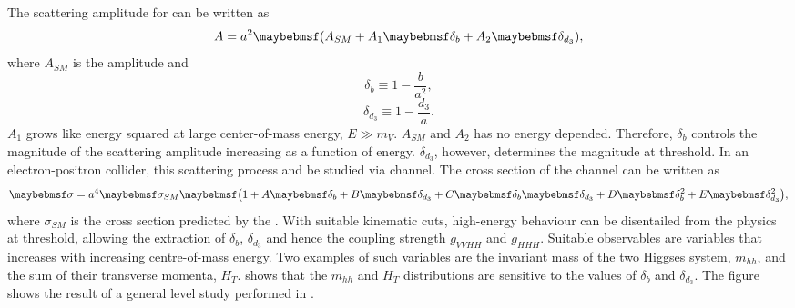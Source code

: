 The scattering amplitude for  can be written as
\begin{equation}
A = a^2\parenths{A_{SM} + A_1\delta_b + A_2\delta_{d_3}},
\end{equation}
where $A_{SM}$ is the \SM amplitude and
\begin{equation}
\delta_b \equiv 1 - \frac{b}{a^2},
\end{equation}
\begin{equation}
\delta_{d_3} \equiv 1 - \frac{d_3}{a}.
\end{equation}
$A_1$ grows like energy squared at large center-of-mass energy, $E\gg{m_V}$. $A_{SM}$ and $A_2$ has no energy depended. Therefore, $\delta_b$ controls the magnitude of the scattering amplitude increasing as a function of energy. $\delta_{d_3}$, however, determines the magnitude at threshold. In an electron-positron collider, this scattering process and be studied via  channel. The cross section of the channel can be written as
\begin{equation}
\label{eq:theoryGeneralHiggsCrossSection}
\sigma = a^4\sigma_{SM}\parenths{1 + A\delta_b + B\delta_{d_3} + C\delta_b\delta_{d_3} + D\delta_b^2 + E\delta_{d_3}^2},
\end{equation}
where $\sigma_{SM}$ is the cross section predicted by the \SM. With suitable kinematic cuts, high-energy behaviour can be disentailed from the physics at threshold, allowing the extraction of $\delta_{b}$, $\delta_{d_3}$ and hence the coupling strength $g_{VVHH}$ and $g_{HHH}$. Suitable observables are variables that increases with  increasing centre-of-mass energy. Two examples of such variables are the invariant mass of the two Higgses system, $m_{hh}$, and the sum of their transverse momenta, $H_T$.  shows that the $m_{hh}$ and $H_T$ distributions are sensitive to the values of $\delta_{b}$ and $\delta_{d_3}$. The figure shows the result of a general level study performed in \cite{Contino:2013gna}.

